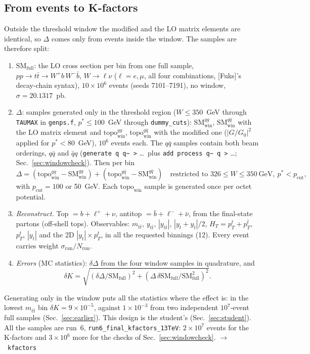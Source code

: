 \documentclass[11pt]{article}
\newcommand{\code}[1]{\texttt{#1}}
\newcommand{\Fuks}{[Fuks]}
\newcommand{\fn}[1]{\hfill$\to$~\code{#1}}
\newcommand{\SMfull}{\mathrm{SM}_\mathrm{full}}
\newcommand{\SMwin}{\mathrm{SM}_\mathrm{win}}
\newcommand{\topowin}{\mathrm{topo}_\mathrm{win}}
\begin{document}
\subsection{From events to K-factors}
\label{sec:kdesign}
Outside the threshold window the modified and the LO matrix elements are identical, so $\Delta$ comes only from events inside the
window. The samples are therefore split:
\begin{enumerate}
  \item \emph{$\SMfull$}: the LO cross section per bin from one full sample, $pp\to t\bar t\to W^+b\,W^-\bar b$, $W\to\ell\nu$
        ($\ell=e,\mu$, all four combinations, \Fuks's decay-chain syntax), $10\times10^6$ events (seeds 7101--7191), no window,
        $\sigma=20.1317$~pb.
  \item \emph{$\Delta$}: samples generated only in the threshold region ($W\le350$~GeV through \code{TAUMAX} in
        \code{genps.f}, $p^*\le100$~GeV through \code{dummy\_cuts}): $\SMwin^{gg}$, $\SMwin^{q\bar q}$ with the LO matrix element
        and $\topowin^{gg}$, $\topowin^{q\bar q}$ with the modified one ($|G/G_0|^2$ applied for $p^*<80$~GeV), $10^6$ events
        each. The $q\bar q$ samples contain both beam orderings, $q\bar q$ and $\bar qq$ (\code{generate q q\~{} >} \ldots\ plus
        \code{add process q\~{} q >} \ldots; Sec.~\ref{sec:windowcheck}). Then per bin
        $$
        \Delta=(\topowin^{gg}-\SMwin^{gg})+(\topowin^{q\bar q}-\SMwin^{q\bar q})\quad\text{restricted to }326\le W\le350~\text{GeV},\
        p^*<p_\mathrm{cut},
        $$
        with $p_\mathrm{cut}=100$ or 50~GeV. Each $\topowin$ sample is generated once per octet potential.
  \item \emph{Reconstruct.} Top $=b+\ell^++\nu$, antitop $=\bar b+\ell^-+\bar\nu$, from the final-state partons (off-shell tops).
        Observables: $m_{t\bar t}$, $y_{t\bar t}$, $|y_{t\bar t}|$, $|y_t+y_{\bar t}|/2$, $H_T=p_T^t+p_T^{\bar t}$, $p_T^t$, $|y_t|$ and
        the 2D $|y_t|\times p_T^t$, in all the requested binnings (12). Every event carries weight $\sigma_\mathrm{run}/N_\mathrm{run}$.
  \item \emph{Errors} (MC statistics): $\delta\Delta$ from the four window samples in quadrature, and
        $$\delta K=\sqrt{(\delta\Delta/\SMfull)^2+(\Delta\,\delta\SMfull/\SMfull^2)^2}.$$
\end{enumerate}
Generating only in the window puts all the statistics where the effect is: in the lowest $m_{t\bar t}$ bin $\delta K=9\times10^{-5}$,
against $1\times10^{-3}$ from two independent $10^7$-event full samples (Sec.~\ref{sec:earlier}). This design is the
student's (Sec.~\ref{sec:student}). All the samples are run~6, \code{run6\_final\_kfactors\_13TeV}: $2\times10^7$ events for the K-factors and
$3\times10^6$ more for the checks of Sec.~\ref{sec:windowcheck}. \fn{kfactors}
\end{document}
